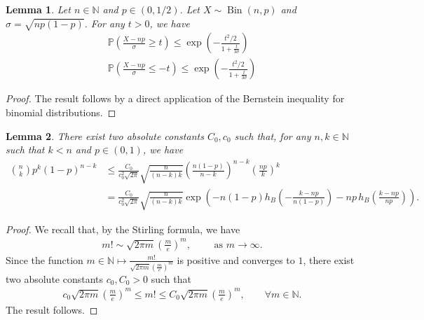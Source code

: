 \documentclass{article}
\newtheorem{lemma}{Lemma}
\begin{document}
\begin{lemma}\label{lem_rescalen_Bernstein}
    Let $n\in \mathbb N$ and $p \in (0,1/2)$. 
    Let $X \sim \operatorname{Bin}(n,p)$ and $\sigma = \sqrt{np(1-p)}$.
    For any $t > 0$, we have
    \begin{align*}
        \mathbb P\left(\frac{X - np}{\sigma} \geq t\right) \leq \exp\left(- \frac{t^2/2}{1+\frac{t}{3\sigma}}\right)\\
        \mathbb P\left(\frac{X - np}{\sigma} \leq -t\right) \leq \exp\left(- \frac{t^2/2}{1+\frac{t}{3\sigma}}\right)
    \end{align*}
\end{lemma}
\begin{proof}
    The result follows by a direct application of the Bernstein inequality for binomial distributions.
\end{proof}

\begin{lemma}\label{lem_Stirling}
    There exist two absolute constants $C_0, c_0$ such that, for any $n,k \in \mathbb N$ such that $k < n$ and $p \in (0,1)$, we have
    \begin{align*}
        {n \choose k} p^k (1-p)^{n-k} &\leq \frac{C_0}{c_0^2\sqrt{2\pi}} \sqrt{\frac{n}{(n-k)k}} \left(\frac{n(1-p)}{n-k}\right)^{n-k} \left(\frac{np}{k}\right)^k\\
        & = \frac{C_0}{c_0^2\sqrt{2\pi}} \sqrt{\frac{n}{(n-k)k}} \exp\left(-n(1-p) h_B\left(-\frac{k-np}{n(1-p)}\right) - np \, h_B\left(\frac{k-np}{np}\right)\right). 
    \end{align*}
\end{lemma}

\begin{proof}
    We recall that, by the Stirling formula, we have
\begin{align*}
m! \sim \sqrt{2\pi m} \left(\frac{m}{e}\right)^m, \qquad \text{ as }m \to \infty.
\end{align*}
Since the function $m\in \mathbb N \mapsto \frac{m!}{\sqrt{2\pi m} \left(\frac{m}{e}\right)^m}$ is positive and converges to $1$, there exist two absolute constants $c_0, C_0>0$ such that
\begin{align}
c_0\sqrt{2\pi m} \left(\frac{m}{e}\right)^m \leq m! \leq C_0 \sqrt{2\pi m} \left(\frac{m}{e}\right)^m, \qquad \forall m \in \mathbb N. \label{eq_Stirling}
\end{align}
The result follows.
\end{proof}
\end{document}
